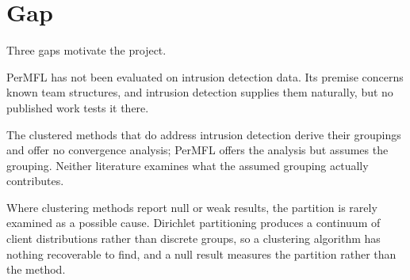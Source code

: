 \section{Gap}
\label{sec:gap}

Three gaps motivate the project.

PerMFL has not been evaluated on intrusion detection data. Its premise concerns
known team structures, and intrusion detection supplies them naturally, but no
published work tests it there.

The clustered methods that do address intrusion detection derive their
groupings and offer no convergence analysis; PerMFL offers the analysis but
assumes the grouping. Neither literature examines what the assumed grouping
actually contributes.

Where clustering methods report null or weak results, the partition is rarely
examined as a possible cause. Dirichlet partitioning produces a continuum of
client distributions rather than discrete groups, so a clustering algorithm has
nothing recoverable to find, and a null result measures the partition rather
than the method.
